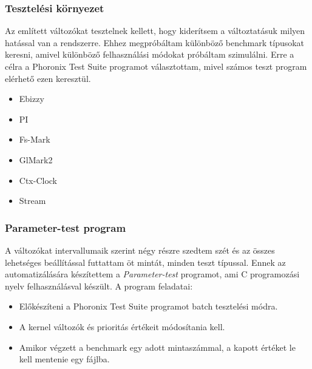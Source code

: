 \documentclass{beamer}
\begin{document}
\begin{frame}
\frametitle{Tesztelési környezet}
Az említett változókat tesztelnek kellett, hogy kiderítsem a változtatásuk milyen hatással van a rendszerre.
Ehhez megpróbáltam különböző benchmark típusokat keresni, amivel különböző felhasználási módokat próbáltam szimulálni.
Erre a célra a Phoronix Test Suite programot választottam, mivel számos teszt program elérhető ezen keresztül.
\begin{itemize}
	\item Ebizzy
	\item PI
	\item Fs-Mark
	\item GlMark2
	\item Ctx-Clock
	\item Stream
\end{itemize}
\end{frame}

\begin{frame}
\frametitle{Parameter-test program}
A változókat intervallumaik szerint négy részre szedtem szét és az összes lehetséges beállítással futtattam öt mintát, minden teszt típussal.
Ennek az automatizálására készítettem a \textit{Parameter-test} programot, ami C programozási nyelv felhasználásval készült. 
A program feladatai:
\begin{itemize}
\pause
\item Előkészíteni a Phoronix Test Suite programot batch tesztelési módra.
\pause
\item A kernel változók és prioritás értékeit módosítania kell.
\pause
\item Amikor végzett a benchmark egy adott mintaszámmal, a kapott értéket le kell mentenie egy fájlba.
\end{itemize}
\end{frame}
\end{document}
